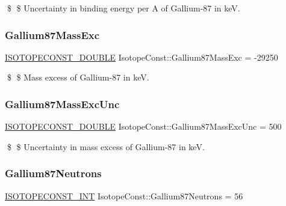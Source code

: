 \$ \$ Uncertainty in binding energy per A of Gallium-\/87 in keV. \mbox{\label{group___isotope_const-_gallium-_ga87_ga7c5a1e267d44c91fe45fcb39e722a3af}} 
\subsubsection{\texorpdfstring{Gallium87\+Mass\+Exc}{Gallium87MassExc}}
{\footnotesize\ttfamily \mbox{\hyperlink{group___isotope_const-_macros_ga8f45a7272ce02c0b4c65c44636ed719a}{I\+S\+O\+T\+O\+P\+E\+C\+O\+N\+S\+T\+\_\+\+D\+O\+U\+B\+LE}} Isotope\+Const\+::\+Gallium87\+Mass\+Exc = -\/29250}

\$ \$ Mass excess of Gallium-\/87 in keV. \mbox{\label{group___isotope_const-_gallium-_ga87_ga4eb879cc60924de00c603a9b35c7e159}} 
\subsubsection{\texorpdfstring{Gallium87\+Mass\+Exc\+Unc}{Gallium87MassExcUnc}}
{\footnotesize\ttfamily \mbox{\hyperlink{group___isotope_const-_macros_ga8f45a7272ce02c0b4c65c44636ed719a}{I\+S\+O\+T\+O\+P\+E\+C\+O\+N\+S\+T\+\_\+\+D\+O\+U\+B\+LE}} Isotope\+Const\+::\+Gallium87\+Mass\+Exc\+Unc = 500}

\$ \$ Uncertainty in mass excess of Gallium-\/87 in keV. \mbox{\label{group___isotope_const-_gallium-_ga87_gabce70999163f201a3e90c5a23e194b09}} 
\subsubsection{\texorpdfstring{Gallium87\+Neutrons}{Gallium87Neutrons}}
{\footnotesize\ttfamily \mbox{\hyperlink{group___isotope_const-_macros_ga5f18360b3e99483a35c32d789e62621c}{I\+S\+O\+T\+O\+P\+E\+C\+O\+N\+S\+T\+\_\+\+I\+NT}} Isotope\+Const\+::\+Gallium87\+Neutrons = 56}

